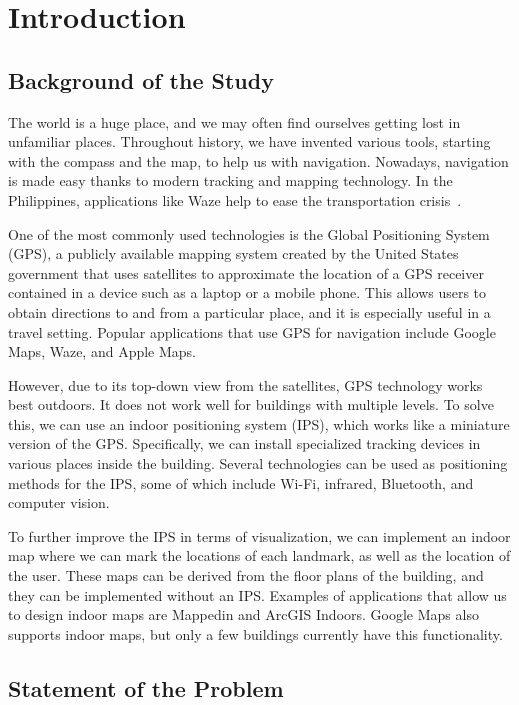 \chapter[INTRODUCTION]{Introduction}\label{ch:I}

\section{Background of the Study}\label{sec:1.1}

The world is a huge place, and we may often find ourselves getting lost in
unfamiliar places. Throughout history, we have invented various tools, starting
with the compass and the map, to help us with navigation. Nowadays, navigation
is made easy thanks to modern tracking and mapping technology. In the
Philippines, applications like Waze help to ease the transportation
crisis~\cite{ref01}.

One of the most commonly used technologies is the Global Positioning System
(GPS), a publicly available mapping system created by the United States
government that uses satellites to approximate the location of a GPS receiver
contained in a device such as a laptop or a mobile phone. This allows users to
obtain directions to and from a particular place, and it is especially useful in
a travel setting. Popular applications that use GPS for navigation include
Google Maps, Waze, and Apple Maps.

However, due to its top-down view from the satellites, GPS technology works best
outdoors. It does not work well for buildings with multiple levels. To solve
this, we can use an indoor positioning system (IPS), which works like a
miniature version of the GPS. Specifically, we can install specialized tracking
devices in various places inside the building. Several technologies can be used
as positioning methods for the IPS, some of which include Wi-Fi, infrared,
Bluetooth, and computer vision.

To further improve the IPS in terms of visualization, we can implement an indoor
map where we can mark the locations of each landmark, as well as the location of
the user. These maps can be derived from the floor plans of the building, and
they can be implemented without an IPS. Examples of applications that allow us
to design indoor maps are Mappedin and ArcGIS Indoors. Google Maps also supports
indoor maps, but only a few buildings currently have this functionality.

\section{Statement of the Problem}\label{sec:1.2}


